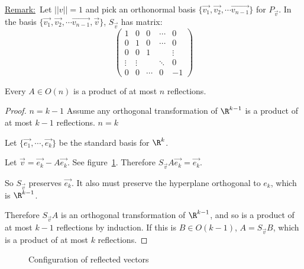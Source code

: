 \documentclass[../Main.tex]{subfiles}
\begin{document}
\underline{Remark:}~Let $||v|| = 1$ and pick an orthonormal basis $\{\vec{v_1}, \vec{v_2}, \cdots \vec{v_{n-1}}\}$ for $P_{\vec{v}}$. In the basis $\{\vec{v_1}, \vec{v_2}, \cdots \vec{v_{n-1}}, \vec{v}\}$, $S_{\vec{v}}$ has matrix:
\begin{equation*}
    \begin{pmatrix}
        1 & 0 & 0 & \cdots & 0 \\
        0 & 1 & 0 & \cdots & 0 \\
        0 & 0 & 1 & & \vdots \\
        \vdots & \vdots & & \ddots & 0 \\
        0 & 0 & \cdots & 0 & -1
    \end{pmatrix}
\end{equation*}
\begin{theorem}
    Every $A \in O(n)$ is a product of at most $n$ reflections.
\end{theorem}
\begin{proof}
    {$n = k - 1$}{
        Assume any orthogonal transformation of $\R^{k-1}$ is a product of at most $k - 1$ reflections.
    }
    {$n=k$}{
        Let $\{\vec{e_1}, \cdots, \vec{e_k}\}$ be the standard basis for $\R^k$.\par
        Let $\vec{v} = \vec{e_k} - A\vec{e_k}$. See figure~\ref{figEnReflection}. Therefore $S_{\vec{v}}A\vec{e_k} = \vec{e_k}$.\par
        So $S_{\vec{v}}$ preserves $\vec{e_k}$. It also must preserve the hyperplane orthogonal to $e_k$, which is $\R^{k-1}$.\par
        Therefore $S_{\vec{v}}A$ is an orthogonal transformation of $\R^{k-1}$, and so is a product of at most $k - 1$ reflections by induction. If this is $B \in O(k-1)$, $A = S_{\vec{v}} B$, which is a product of at most $k$ reflections.
    }
\end{proof}
\begin{figure}[hb]
    \centering
    \caption{Configuration of reflected vectors}
    \label{figEnReflection}
\end{figure}
\end{document}
